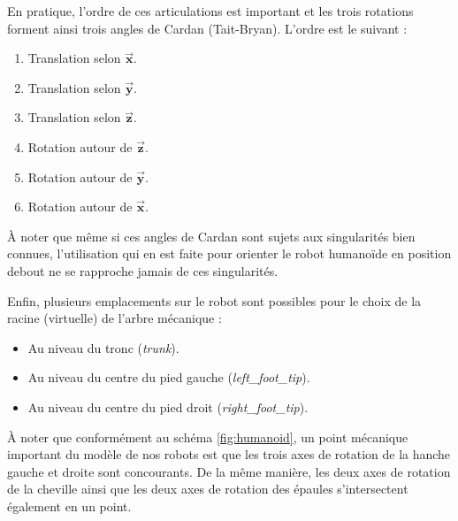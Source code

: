 En pratique, l'ordre de ces articulations est important et
les trois rotations forment ainsi trois angles de Cardan (Tait-Bryan).
L'ordre est le suivant :
\begin{enumerate}
    \item Translation selon $\vec{\bm{x}}$.
    \item Translation selon $\vec{\bm{y}}$.
    \item Translation selon $\vec{\bm{z}}$.
    \item Rotation autour de $\vec{\bm{z}}$.
    \item Rotation autour de $\vec{\bm{y}}$.
    \item Rotation autour de $\vec{\bm{x}}$.
\end{enumerate}
À noter que même si ces angles de Cardan sont sujets aux singularités
bien connues, l'utilisation qui en est faite pour orienter le robot humanoïde
en position debout ne se rapproche jamais de ces singularités.

Enfin, plusieurs emplacements sur le robot sont possibles 
pour le choix de la racine (virtuelle) de l'arbre mécanique :
\begin{itemize}
    \item Au niveau du tronc (\textit{trunk}).
    \item Au niveau du centre du pied gauche (\textit{left\_foot\_tip}).
    \item Au niveau du centre du pied droit (\textit{right\_foot\_tip}).
\end{itemize}

À noter que conformément au schéma \ref{fig:humanoid}, 
un point mécanique important du modèle de nos robots
est que les trois axes de rotation de la hanche gauche 
et droite sont concourants. 
De la même manière, les deux axes de rotation
de la cheville ainsi que les deux axes de rotation des épaules 
s'intersectent également en un point.

